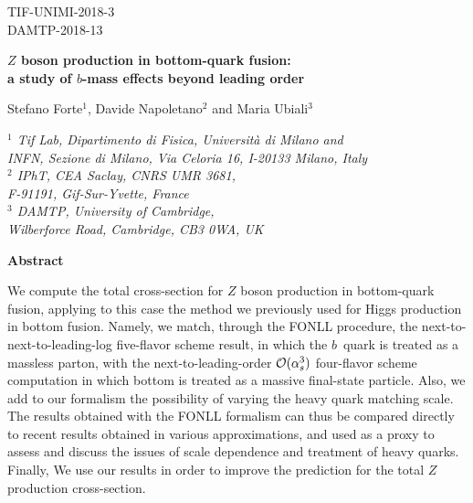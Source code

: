 \documentclass[12pt]{article}
\newcommand{\order}[1]{{\cal O}(#1)}
\begin{document}
\begin{flushright}
  TIF-UNIMI-2018-3\\
  DAMTP-2018-13
\end{flushright}

\vspace*{.2cm}

\begin{center}
  {\Large \bf{$Z$ boson production in bottom-quark fusion:\\
      a study of $b$-mass effects beyond leading order}}
\end{center}

\vspace*{.7cm}

\begin{center}
  Stefano Forte$^{1}$, Davide Napoletano$^2$ and Maria Ubiali$^{3}$
  \vspace*{.2cm}

  \noindent
      {\it
        $^1$ Tif Lab, Dipartimento di Fisica, Universit\`a di Milano and\\ 
        INFN, Sezione di Milano,
        Via Celoria 16, I-20133 Milano, Italy\\
        $^2$ IPhT, CEA Saclay, CNRS UMR 3681,\\ F-91191, Gif-Sur-Yvette, France\\
        $^3$ DAMTP, University of Cambridge,\\ Wilberforce Road, Cambridge, CB3 0WA, UK\\}

      \vspace*{3cm}

      {\bf Abstract}
\end{center}

\noindent
We compute the total cross-section for $Z$ boson production in
bottom-quark fusion, applying to this case the method we previously
used for Higgs production in bottom fusion. Namely, we  match, through
the FONLL procedure,
the  next-to-next-to-leading-log five-flavor
scheme result, in which  the $b$~quark is
treated as a massless parton, with the next-to-leading-order
$\order{\alpha_s^3}$  
four-flavor scheme computation in which bottom is treated as a massive
final-state particle.
Also, we add to our formalism the possibility of varying the
heavy quark matching scale. 
The results obtained with the FONLL formalism can thus be compared
directly
 to recent results obtained in various approximations, and used as a
proxy 
to assess and discuss the issues of scale dependence and treatment of heavy
quarks. Finally, We use our results in order 
to improve the prediction for the total
$Z$ production cross-section.
\end{document}
